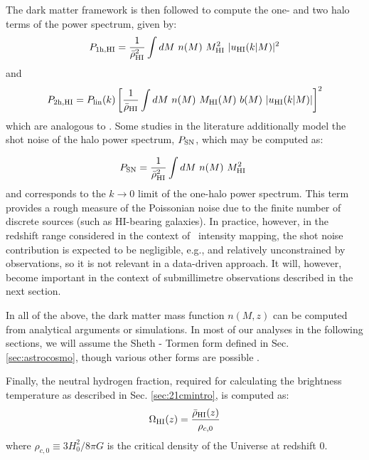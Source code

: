 The dark matter framework is then followed to compute the one- and two halo terms of the \HI{} power spectrum, given by:
\begin{equation}
P_{\rm 1h, HI} =  \frac{1}{\bar{\rho}_{\rm HI}^2} \int dM \  n(M) \ M_{\rm HI}^2 \ |u_{\rm HI} (k|M)|^2
\label{onehalo}
\end{equation}
and
\begin{equation}
P_{\rm 2h, HI} =  P_{\rm lin} (k) \left[\frac{1}{\bar{\rho}_{\rm HI}} \int dM \  n(M) \ M_{\rm HI} (M) \ b (M) \ |u_{\rm HI} (k|M)| \right]^2
\label{twohalo}
\end{equation}
which are analogous to .
Some studies in the literature \cite{wolz2019, villaescusa2018} additionally model the shot noise of the halo power spectrum, $P_{\rm SN}$, which may be computed as:

\begin{equation}
   P_{\rm SN} =  \frac{1}{\bar{\rho}_{\rm HI}^2} \int dM \  n(M) \ M_{\rm HI}^2 \ 
   \label{shotnoiseHI}
\end{equation}
and corresponds to the $k \to 0$ limit of the one-halo power spectrum. This term provides a rough measure of the  Poissonian noise due to the finite number of discrete sources (such as HI-bearing galaxies).
In practice, however, in the redshift range considered in the context of \HI\ intensity
mapping, the shot noise contribution is expected to be negligible, e.g., \cite{seo2010, seehars2016} and relatively unconstrained by observations, so it is not relevant in a data-driven approach. It will, however, become important in the context of submillimetre observations described in the next section.

In all of the above, the dark matter mass function $n(M, z)$ can be computed from analytical arguments or simulations. In most of our analyses in the following sections, we will assume the Sheth - Tormen form defined in Sec. \ref{sec:astrocosmo}, though various other forms are possible \cite{tinker2008, shirasaki2021}.
 
Finally, the neutral hydrogen fraction, required for calculating the brightness temperature as described in Sec. \ref{sec:21cmintro}, is computed as:
\begin{equation}
 \Omega_{\rm HI} (z) = \frac{\bar{\rho}_{\rm HI}(z)}{\rho_{c,0}}
 \label{omegaHIanalyt}
\end{equation} 
where $\rho_{c,0} \equiv 3 H_0^2/8 \pi G$ is the critical density of the Universe at redshift 0.



